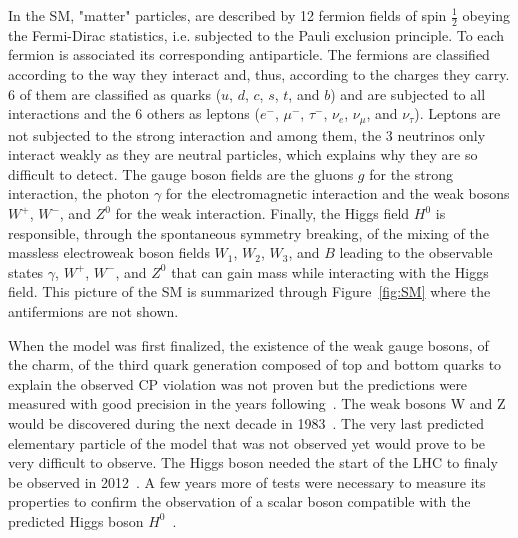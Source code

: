 	In the SM, "matter" particles, are described by 12 fermion fields of spin $\frac{1}{2}$ obeying the Fermi-Dirac statistics, i.e. subjected to the Pauli exclusion principle. To each fermion is associated its corresponding antiparticle. The fermions are classified according to the way they interact and, thus, according to the charges they carry. 6 of them are classified as quarks ($u$, $d$, $c$, $s$, $t$, and $b$) and are subjected to all interactions and the 6 others as leptons ($e^-$, $\mu^-$, $\tau^-$, $\nu_e$, $\nu_\mu$, and $\nu_\tau$). Leptons are not subjected to the strong interaction and among them, the 3 neutrinos only interact weakly as they are neutral particles, which explains why they are so difficult to detect. The gauge boson fields are the gluons $g$ for the strong interaction, the photon $\gamma$ for the electromagnetic interaction and the weak bosons $W^+$, $W^-$, and $Z^0$ for the weak interaction. Finally, the Higgs field $H^0$ is responsible, through the spontaneous symmetry breaking, of the mixing of the massless electroweak boson fields $W_1$, $W_2$, $W_3$, and $B$ leading to the observable states $\gamma$, $W^+$, $W^-$, and $Z^0$ that can gain mass while interacting with the Higgs field. This picture of the SM is summarized through Figure~\ref{fig:SM} where the antifermions are not shown.
	
	When the model was first finalized, the existence of the weak gauge bosons, of the charm, of the third quark generation composed of top and bottom quarks to explain the observed CP violation was not proven but the predictions were measured with good precision in the years following~\cite{TING1974,RICHTER1974,HERB1977,ABASHI1995,ABE1995}. The weak bosons W and Z would be discovered during the next decade in 1983~\cite{UA1W1983,UA2W1983,UA1Z1983,UA2Z1983}. The very last predicted elementary particle of the model that was not observed yet would prove to be very difficult to observe. The Higgs boson needed the start of the LHC to finaly be observed in 2012~\cite{ATLAS2012,CMS2012}. A few years more of tests were necessary to measure its properties to confirm the observation of a scalar boson compatible with the predicted Higgs boson $H^0$~\cite{HIGGS2015}.
	
